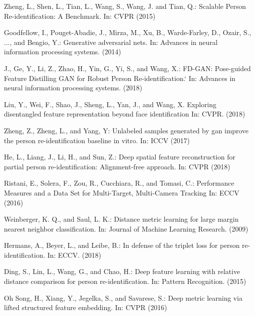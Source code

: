 \documentclass[10pt,twocolumn,letterpaper]{article}
\begin{document}
\begin{thebibliography}{8}
\newblock Zheng, L., Shen, L., Tian, L., Wang, S., Wang, J. and Tian, Q.:
\newblock Scalable Person Re-identification: A Benchmark.
\newblock In: CVPR (2015)

\newblock Goodfellow, I., Pouget-Abadie, J., Mirza, M., Xu, B., Warde-Farley, D., Ozair, S., ..., and Bengio, Y.:
\newblock Generative adversarial nets.
\newblock In: Advances in neural information processing systems. (2014)

\newblock J., Ge, Y., Li, Z., Zhao, H., Yin, G., Yi, S., and Wang, X.:
\newblock FD-GAN: Pose-guided Feature Distilling GAN for Robust Person Re-identification.`
\newblock In: Advances in neural information processing systems. (2018)


\newblock Liu, Y., Wei, F., Shao, J., Sheng, L., Yan, J., and Wang, X. 
\newblock Exploring disentangled feature representation beyond face identification
\newblock In: CVPR. (2018)


\newblock Zheng, Z., Zheng, L., and Yang, Y:
\newblock Unlabeled samples generated by gan improve the person re-identification baseline in vitro.
\newblock In: ICCV (2017)


\newblock He, L., Liang, J., Li, H., and Sun, Z.:
\newblock Deep spatial feature reconstruction for partial person
  re-identification: Alignment-free approach.
\newblock In: CVPR (2018)


\newblock Ristani, E., Solera, F., Zou, R., Cucchiara, R., and Tomasi, C.:
\newblock Performance Measures and a Data Set for Multi-Target, Multi-Camera Tracking
\newblock In: ECCV (2016)


\newblock Weinberger, K. Q., and Saul, L. K.:
\newblock Distance metric learning for large margin nearest neighbor classification.
\newblock In: Journal of Machine Learning Research. (2009)


\newblock Hermans, A., Beyer, L., and  Leibe, B.:
\newblock In defense of the triplet loss for person re-identification.
\newblock In: ECCV. (2018)


\newblock Ding, S., Lin, L., Wang, G., and Chao, H.:
\newblock Deep feature learning with relative distance comparison for person re-identification.
\newblock In: Pattern Recognition. (2015)


\newblock Oh Song, H., Xiang, Y., Jegelka, S., and Savarese, S.:
\newblock Deep metric learning via lifted structured feature embedding.
\newblock In: CVPR (2016)


\end{thebibliography}
\end{document}
